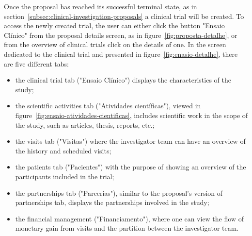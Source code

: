 Once the proposal has reached its successful terminal state, as in section~\ref{subsec:clinical-investigation-proposals} a clinical trial will be created. To access the newly created trial, the user can either click the button "Ensaio Clínico" from the proposal details screen, as in figure~\ref{fig:proposta-detalhe}, or from the overview of clinical trials click on the details of one.  
In the screen dedicated to the clinical trial and presented in figure~\ref{fig:enasio-detalhe}, there are five different tabs: 
\begin{itemize}
    \item the clinical trial tab ("Ensaio Clínico") displays the characteristics of the study;
    \item the scientific activities tab ("Atividades científicas"), viewed in figure~\ref{fig:ensaio-atividades-cientificas}, includes scientific work in the scope of the study, such as articles, thesis, reports, etc.;
    \item  the visits tab ("Visitas") where the investigator team can have an overview of the history and scheduled visits;
    \item the patients tab ("Pacientes") with the purpose of showing an overview of the participants included in the trial;
    \item the partnerships tab ("Parcerias"), similar to the proposal's version of partnerships tab, displays the partnerships involved in the study;
    \item the financial management ("Financiamento"), where one can view the flow of monetary gain from visits and the partition between the investigator team.
\end{itemize}

